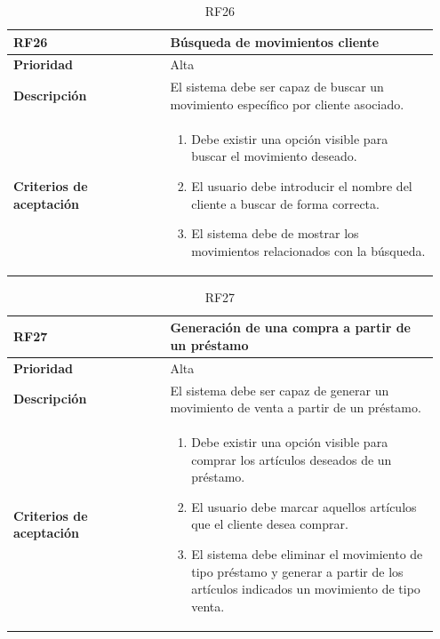 \begin{table}[H]
	\centering %
	\begin{tabular}{|p{0.35\linewidth}|p{0.6\linewidth}|}
		\hline
		\rowcolor{grayshade} \textbf{RF26} & \textbf{Búsqueda de movimientos cliente} \\
		\hline
		\textbf{Prioridad} & Alta \\
		\hline
		\textbf{Descripción} & El sistema debe ser capaz de buscar un movimiento específico por cliente asociado.\\
		\hline
		\vspace{0.5mm}
		\textbf{Criterios de aceptación} & 
		\begin{minipage}[t]{0.9\linewidth}
			\begin{enumerate}
				\item Debe existir una opción visible para buscar el movimiento deseado.
				\item El usuario debe introducir el nombre del cliente a buscar de forma correcta.
				\item El sistema debe de mostrar los movimientos relacionados con la búsqueda.   
			\end{enumerate}
			\vspace{2mm}
		\end{minipage} \\
		\hline
	\end{tabular}
	\caption{RF26}
\end{table}

\begin{table}[H]
	\centering %
	\begin{tabular}{|p{0.35\linewidth}|p{0.6\linewidth}|}
		\hline
		\rowcolor{grayshade} \textbf{RF27} & \textbf{Generación de una compra a partir de un préstamo} \\
		\hline
		\textbf{Prioridad} & Alta \\
		\hline
		\textbf{Descripción} & El sistema debe ser capaz de generar un movimiento de venta a partir de un préstamo.\\
		\hline
		\vspace{0.5mm}
		\textbf{Criterios de aceptación} & 
		\begin{minipage}[t]{0.9\linewidth}
			\begin{enumerate}
				\item Debe existir una opción visible para comprar los artículos deseados de un préstamo.
				\item El usuario debe marcar aquellos artículos que el cliente desea comprar.
				\item El sistema debe eliminar el movimiento de tipo préstamo y generar a partir de los artículos indicados un movimiento de tipo venta.   
			\end{enumerate}
			\vspace{2mm}
		\end{minipage} \\
		\hline
	\end{tabular}
	\caption{RF27}
\end{table}



